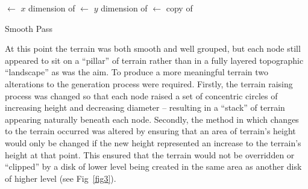 \documentclass[10pt,letterpaper]{article}
\begin{document}
\begin{algorithm}[H]

 
 
 
  



\BlankLine

\HeightMapWidth $\leftarrow$ $x$ dimension of \Heights\;
\HeightMapHeight $\leftarrow$ $y$ dimension of \Heights\;
\NewHeights $\leftarrow$ copy of \Heights\;

\BlankLine

\caption{Smooth Pass}
\end{algorithm}

At this point the terrain was both smooth and well grouped, but each node still appeared to sit on a “pillar” of terrain rather than in a fully layered topographic “landscape” as was the aim. To produce a more meaningful terrain two alterations to the generation process were required. Firstly, the terrain raising process was changed so that each node raised a set of concentric circles of increasing height and decreasing diameter – resulting in a “stack” of terrain appearing naturally beneath each node. Secondly, the method in which changes to the terrain occurred was altered by ensuring that an area of terrain’s height would only be changed if the new height represented an increase to the terrain’s height at that point. This ensured that the terrain would not be overridden or “clipped” by a disk of lower level being created in the same area as another disk of higher level (see Fig~\ref{fig3}).
\end{document}
